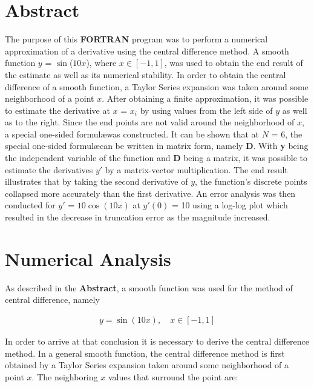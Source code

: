 \documentclass[12pt]{article}
\begin{document}

\newpage
\section*{Abstract}
\begin{doublespace}
The purpose of this \textbf{FORTRAN} program was to perform a numerical approximation of a derivative using the central difference method. A smooth function $y$ = $\sin$($10x$), where $x\in[-1,1]$, was used to obtain the end result of the estimate as well as its numerical stability. In order to obtain the central difference of a smooth function, a Taylor Series expansion was taken around some neighborhood of a point $x$. After obtaining a finite approximation, it was possible to estimate the derivative at $x$ = $x_{i}$ by using values from the left side of $y$ as well as to the right. Since the end points are not valid around the neighborhood of $x$, a special one-sided formul\ae was constructed. It can be shown that at $N$ = 6, the special one-sided formul\ae can be written in matrix form, namely {\bf D}. With {\bf y} being the independent variable of the function and {\bf D} being a matrix, it was possible to estimate the derivatives {\bf $y'$} by a matrix-vector multiplication. The end result illustrates that by taking the second derivative of $y$, the function's discrete points collapsed more accurately than the first derivative. An error analysis was then conducted for $y'$ = $10\cos(10x)$ at $y'(0)$ = 10 using a log-log plot which resulted in the decrease in truncation error as the magnitude increased. 
\end{doublespace}

\newpage
\section*{Numerical Analysis}
\begin{doublespace}
As described in the {\bf Abstract}, a smooth function was used for the method of central difference, namely 
\end{doublespace}

\begin{eqnarray}
y = \sin(10x), \quad x \in [-1,1] \label{ee1}
\end{eqnarray}

\begin{doublespace}
\noindent
In order to arrive at that conclusion it is necessary to derive the central difference method. In a general smooth function, the central difference method is first obtained by a Taylor Series expansion taken around some neighborhood of a point $x$. The neighboring $x$ values that surround the point are:
\end{doublespace}
\end{document}
